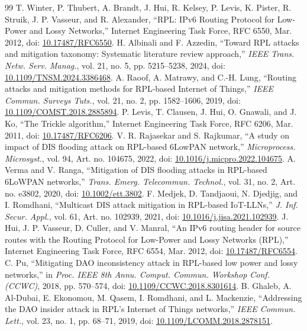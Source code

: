 \begin{thebibliography}{99}
 T. Winter, P. Thubert, A. Brandt, J. Hui, R. Kelsey, P. Levis, K. Pister, R. Struik, J. P. Vasseur, and R. Alexander, ``RPL: IPv6 Routing Protocol for Low-Power and Lossy Networks,'' Internet Engineering Task Force, RFC 6550, Mar. 2012, doi: \href{https://doi.org/10.17487/RFC6550}{10.17487/RFC6550}.
 H. Albinali and F. Azzedin, ``Toward RPL attacks and mitigation taxonomy: Systematic literature review approach,'' \emph{IEEE Trans. Netw. Serv. Manag.}, vol. 21, no. 5, pp. 5215--5238, 2024, doi: \href{https://doi.org/10.1109/TNSM.2024.3386468}{10.1109/TNSM.2024.3386468}.
 A. Raoof, A. Matrawy, and C.-H. Lung, ``Routing attacks and mitigation methods for RPL-based Internet of Things,'' \emph{IEEE Commun. Surveys Tuts.}, vol. 21, no. 2, pp. 1582--1606, 2019, doi: \href{https://doi.org/10.1109/COMST.2018.2885894}{10.1109/COMST.2018.2885894}.
 P. Levis, T. Clausen, J. Hui, O. Gnawali, and J. Ko, ``The Trickle algorithm,'' Internet Engineering Task Force, RFC 6206, Mar. 2011, doi: \href{https://doi.org/10.17487/RFC6206}{10.17487/RFC6206}.
 V. R. Rajasekar and S. Rajkumar, ``A study on impact of DIS flooding attack on RPL-based 6LowPAN network,'' \emph{Microprocess. Microsyst.}, vol. 94, Art. no. 104675, 2022, doi: \href{https://doi.org/10.1016/j.micpro.2022.104675}{10.1016/j.micpro.2022.104675}.
 A. Verma and V. Ranga, ``Mitigation of DIS flooding attacks in RPL-based 6LoWPAN networks,'' \emph{Trans. Emerg. Telecommun. Technol.}, vol. 31, no. 2, Art. no. e3802, 2020, doi: \href{https://doi.org/10.1002/ett.3802}{10.1002/ett.3802}.
 F. Medjek, D. Tandjaoui, N. Djedjig, and I. Romdhani, ``Multicast DIS attack mitigation in RPL-based IoT-LLNs,'' \emph{J. Inf. Secur. Appl.}, vol. 61, Art. no. 102939, 2021, doi: \href{https://doi.org/10.1016/j.jisa.2021.102939}{10.1016/j.jisa.2021.102939}.
 J. Hui, J. P. Vasseur, D. Culler, and V. Manral, ``An IPv6 routing header for source routes with the Routing Protocol for Low-Power and Lossy Networks (RPL),'' Internet Engineering Task Force, RFC 6554, Mar. 2012, doi: \href{https://doi.org/10.17487/RFC6554}{10.17487/RFC6554}.
 C. Pu, ``Mitigating DAO inconsistency attack in RPL-based low power and lossy networks,'' in \emph{Proc. IEEE 8th Annu. Comput. Commun. Workshop Conf. (CCWC)}, 2018, pp. 570--574, doi: \href{https://doi.org/10.1109/CCWC.2018.8301614}{10.1109/CCWC.2018.8301614}.
 B. Ghaleb, A. Al-Dubai, E. Ekonomou, M. Qasem, I. Romdhani, and L. Mackenzie, ``Addressing the DAO insider attack in RPL's Internet of Things networks,'' \emph{IEEE Commun. Lett.}, vol. 23, no. 1, pp. 68--71, 2019, doi: \href{https://doi.org/10.1109/LCOMM.2018.2878151}{10.1109/LCOMM.2018.2878151}.

\end{thebibliography}
